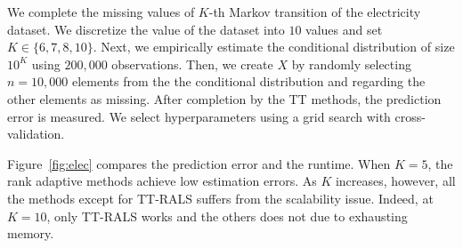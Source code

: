 
We complete the missing values of $K$-th Markov transition of the
electricity dataset.  We discretize the value of the dataset into $10$
values and set $K \in \{ 6,7,8,10\}$.  Next, we empirically estimate
the conditional distribution of size $10^K$ using $200,000$
observations.  Then, we create $X$ by randomly selecting $n=10,000$
elements from the the conditional distribution and regarding the other
elements as missing. After completion by the TT methods, the
prediction error is measured.  We select hyperparameters using a grid
search with cross-validation.

Figure~\ref{fig:elec} compares the prediction error and the runtime.
When $K=5$, the rank adaptive methods achieve low estimation errors.
As $K$ increases, however, all the methods except for TT-RALS suffers
from the scalability issue. Indeed, at $K=10$, only TT-RALS works and
the others does not due to exhausting memory.



